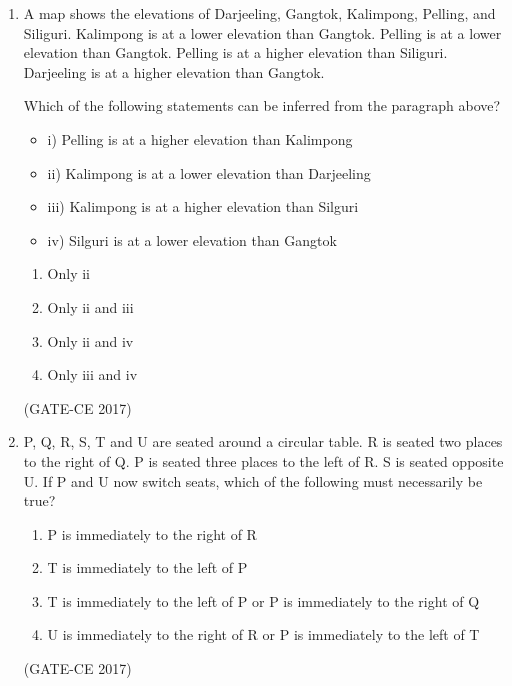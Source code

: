 \documentclass[journal,12pt,onecolumn]{article}
\theoremstyle{remark}
\begin{document}
\begin{enumerate}
    \item A map shows the elevations of Darjeeling, Gangtok, Kalimpong, Pelling, and Siliguri.  
    Kalimpong is at a lower elevation than Gangtok. Pelling is at a lower elevation than Gangtok.  
    Pelling is at a higher elevation than Siliguri. Darjeeling is at a higher elevation than Gangtok.

    Which of the following statements can be inferred from the paragraph above?
    \begin{itemize}
    \item i) Pelling is at a higher elevation than Kalimpong 
    \item ii) Kalimpong is at a lower elevation than Darjeeling 
    \item iii) Kalimpong is at a higher elevation than Silguri 
    \item iv) Silguri is at a lower elevation than Gangtok
    \end{itemize}
    
    \begin{multicols}{2}
    \begin{enumerate}
        \item Only ii  
        \item Only ii and iii  
        \item Only ii and iv  
        \item Only iii and iv  
    \end{enumerate}
    \end{multicols}
   \hfill (GATE-CE 2017)

    \item P, Q, R, S, T and U are seated around a circular table. R is seated two places to the right of Q. P is seated three places to the left of R. S is seated opposite U. If P and U now switch seats, which of the following must necessarily be true?
    \begin{enumerate}
        \item P is immediately to the right of R  
        \item T is immediately to the left of P  
        \item T is immediately to the left of P or P is immediately to the right of Q  
        \item U is immediately to the right of R or P is immediately to the left of T  
    \end{enumerate}
    \hfill (GATE-CE 2017)


\end{enumerate}
\end{document}
